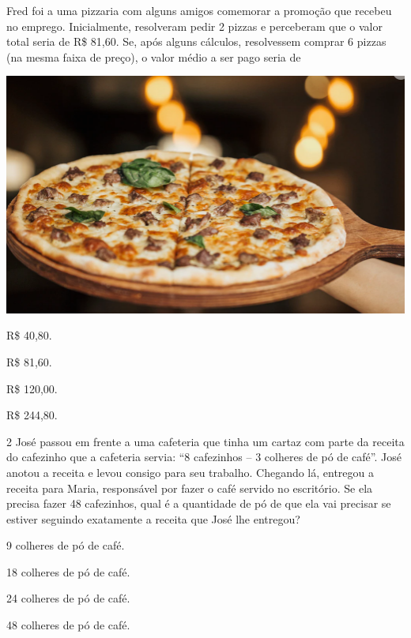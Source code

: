 \begin{minipage}{.5\textwidth}
Fred foi a uma pizzaria com alguns amigos comemorar a promoção que recebeu no emprego.
Inicialmente, resolveram pedir 2 pizzas e perceberam que o valor total
seria de R\$ 81,60. Se, após alguns cálculos, resolvessem comprar 6
pizzas (na mesma faixa de preço), o valor médio a ser pago seria de
\end{minipage}\hspace{.5cm}
\begin{minipage}{.5\textwidth}
\includegraphics[width=\textwidth]{media/image72.png}
\end{minipage}

\begin{multicols}{2}
\begin{escolha}
\item
  R\$ 40,80.
\item
  R\$ 81,60.
\item
  R\$ 120,00.
\item
  R\$ 244,80.
\end{escolha}
\end{multicols}

\num{2} José passou em frente a uma cafeteria que tinha um cartaz com parte da
receita do cafezinho que a cafeteria servia: ``8 cafezinhos -- 3 colheres de pó de café''.
José anotou a receita e levou consigo para seu trabalho. Chegando lá,
entregou a receita para Maria, responsável por fazer o café servido no
escritório. Se ela precisa fazer 48 cafezinhos, qual é a
quantidade de pó de que ela vai precisar se estiver seguindo exatamente a
receita que José lhe entregou?

\begin{escolha}
\item
  9 colheres de pó de café.
\item
  18 colheres de pó de café.
\item
  24 colheres de pó de café.
\item
  48 colheres de pó de café.
\end{escolha}

